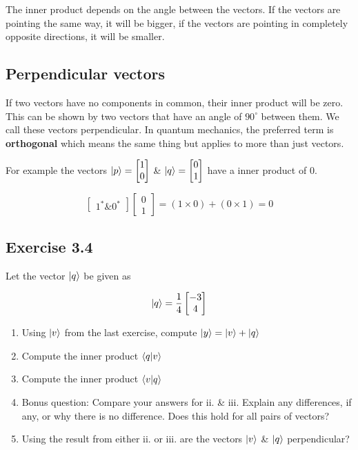 \documentclass{book}
\begin{document}
The inner product depends on the angle between the vectors. If the vectors are pointing the same way, it will be bigger, if the vectors are pointing in completely opposite directions, it will be smaller. 

\subsection{ Perpendicular vectors }

If two vectors have no components in common, their inner product will be zero. This can be shown by two vectors that have an angle of $ 90^{\circ} $ between them.  We call these vectors perpendicular. In quantum mechanics, the preferred term is \textbf{orthogonal} which means the same thing but applies to more than just vectors. 

For example the vectors $\ket{p} = \begin{bmatrix} 1 \\ 0 \end{bmatrix}$ \& $\ket{q} = \begin{bmatrix} 0 \\ 1 \end{bmatrix}$ have a inner product  of 0. 

$$ \begin{bmatrix} 1^* \& 0^* \end{bmatrix}  \begin{bmatrix} 0 \\ 1 \end{bmatrix} = (1 \times 0) + (0 \times 1) = 0$$

\hline

\subsection{Exercise 3.4}

Let the vector $\ket{q}$ be given as 

$$ \ket{q} = \frac{1}{4} \begin{bmatrix} -3 \\ 4 \end{bmatrix} $$

\begin{enumerate}[i]
    \item Using $\ket{v}$ from the last exercise, compute  $\ket{y} = \ket{v} + \ket{q} $
    \item Compute the inner product $ \braket{q | v} $
    \item Compute the inner product $ \braket{v | q} $ 
    \item Bonus question: Compare your answers for ii. \& iii. Explain any differences, if any, or why there is no difference. Does this hold for all pairs of vectors?
    \item Using the result from either ii. or iii. are the vectors $\ket{v}$ \& $\ket{q}$ perpendicular?
    
\end{enumerate}
\end{document}
